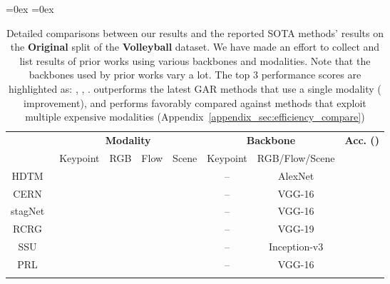 \documentclass[runningheads]{llncs}
\begin{document}
\begin{table*}[t] 
\fontsize{7.5pt}{7.5pt}\selectfont
   \aboverulesep=0ex
   \belowrulesep=0ex 
  \begin{center}
  \caption{Detailed comparisons between our results and the reported SOTA methods' results on the \textbf{Original} split of the \textbf{Volleyball} dataset.  
  We have made an effort to collect and list results of prior works using various backbones and modalities. Note that the backbones used by prior works vary a lot. 
The top 3 performance scores are highlighted as:
\textbf{}, , . 
\ours outperforms the latest GAR methods that use a single modality ( improvement), and performs favorably compared against methods that exploit multiple 
expensive
modalities (Appendix~\ref{appendix_sec:efficiency_compare})}
\label{table:VD_compare_sota_detailed}
\vspace{-15pt}
   \begin{tabular}[t]{c|c|c|c|c|c|c|c}
   \toprule
   \rule{0pt}{1.0EM} 
   \multirow{2}{*}{\textbf{Method}} & \multicolumn{4}{c|}{\textbf{Modality}}    & \multicolumn{2}{c|}{\textbf{Backbone}}  & \multirow{2}{*}{\textbf{Acc.  ()}}  \\ \cline{2-7}  
  & Keypoint & RGB & Flow & Scene & Keypoint & RGB/Flow/Scene   &   \\
   \bottomrule\rowcolor{aureolin!10}
   \rule{0pt}{1.2EM} 
 HDTM~\cite{ibrahim2016hierarchical}   &       &  \tablecheck{\CheckmarkBold}    &      &       &   --   &   AlexNet &         \\ \midrule\rowcolor{aureolin!10} \rule{0pt}{1.2EM}   
 CERN~\cite{cern}   &          &  \tablecheck{\CheckmarkBold}    &      &       &   --   &   VGG-16 &          \\ \midrule\rowcolor{aureolin!10} \rule{0pt}{1.2EM}
 stagNet~\cite{stagnet}   &          &  \tablecheck{\CheckmarkBold}    &      &       &   --   &   VGG-16 &      \\ \midrule\rowcolor{aureolin!10} \rule{0pt}{1.2EM}
 RCRG~\cite{rcrg}   &          &  \tablecheck{\CheckmarkBold}    &      &       &    --  &   VGG-19 &       \\ \midrule\rowcolor{aureolin!10} \rule{0pt}{1.2EM}
 SSU~\cite{ssu}   &         &  \tablecheck{\CheckmarkBold}    &      &       &   --   &    Inception-v3 &       \\ \midrule\rowcolor{aureolin!10} \rule{0pt}{1.2EM}
 PRL~\cite{prl}   &      &  \tablecheck{\CheckmarkBold}    &      &       &   --   &   VGG-16   &       \\ \midrule\rowcolor{aureolin!10} \rule{0pt}{1.2EM}

\end{tabular}
\end{center}
\end{table*}
\end{document}
